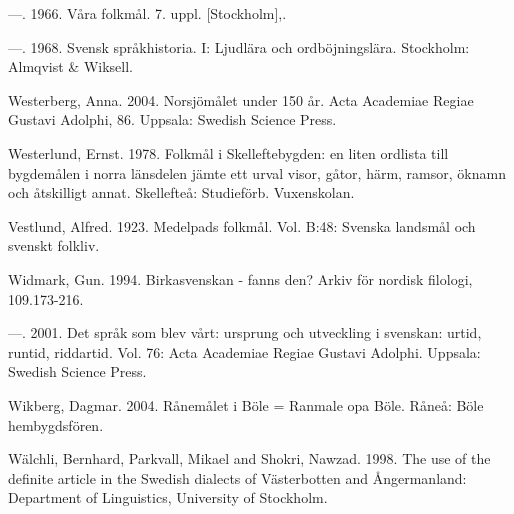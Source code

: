 \begin{styleBodytextC}
—.  1966. Våra folkmål.  7. uppl. [Stockholm],.

\end{styleBodytextC}

\begin{styleBodytextC}
—. 1968. Svensk språkhistoria.  I: Ljudlära och ordböjningslära. Stockholm: Almqvist \& Wiksell.

\end{styleBodytextC}

\begin{styleBodytextC}
Westerberg, Anna. 2004. Norsjömålet under 150 år. Acta Academiae Regiae Gustavi Adolphi, 86. Uppsala: Swedish Science Press.

\end{styleBodytextC}

\begin{styleBodytextC}
Westerlund, Ernst. 1978. Folkmål i Skelleftebygden: en liten ordlista till bygdemålen i norra länsdelen jämte ett urval visor, gåtor, härm, ramsor, öknamn och åtskilligt annat. Skellefteå: Studieförb. Vuxenskolan.

\end{styleBodytextC}

\begin{styleBodytextC}
Vestlund, Alfred. 1923. Medelpads folkmål. Vol. B:48: Svenska landsmål och svenskt folkliv.

\end{styleBodytextC}

\begin{styleBodytextC}
Widmark, Gun. 1994. Birkasvenskan - fanns den? Arkiv för nordisk filologi, 109.173-216.

\end{styleBodytextC}

\begin{styleBodytextC}
—. 2001. Det språk som blev vårt: ursprung och utveckling i svenskan: urtid, runtid, riddartid. Vol. 76: Acta Academiae Regiae Gustavi Adolphi. Uppsala: Swedish Science Press.

\end{styleBodytextC}

\begin{styleBodytextC}
Wikberg, Dagmar. 2004. Rånemålet i Böle = Ranmale opa Böle. Råneå: Böle hembygdsfören.

\end{styleBodytextC}

\begin{styleBodytextC}
Wälchli, Bernhard, Parkvall, Mikael and Shokri, Nawzad. 1998. The use of the definite article in the Swedish dialects of Västerbotten and Ångermanland: Department of Linguistics, University of Stockholm.

\end{styleBodytextC}


